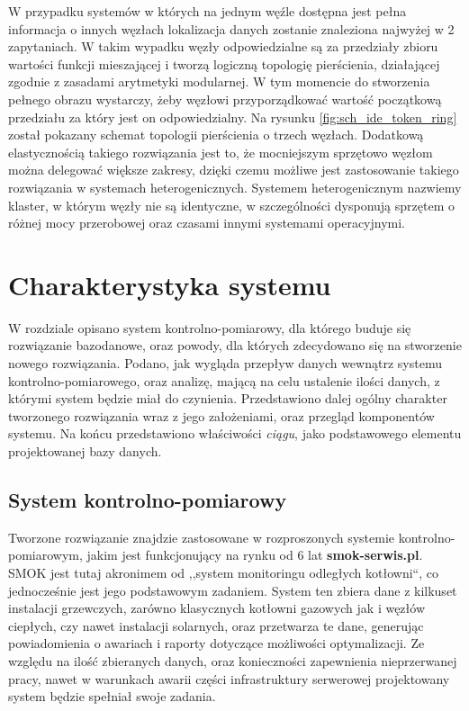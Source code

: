 \documentclass[a4paper,polish,12pt,twoside]{article}
\def \docsection#1{\clearpage\section{#1}}
\begin{document}
W przypadku systemów w których na jednym węźle dostępna jest pełna informacja o innych węzłach lokalizacja danych zostanie znaleziona najwyżej w 2 zapytaniach. W takim wypadku węzły odpowiedzialne są za przedziały zbioru wartości funkcji mieszającej i tworzą logiczną topologię pierścienia, działającej zgodnie z zasadami arytmetyki modularnej. W tym momencie do stworzenia pełnego obrazu wystarczy, żeby węzłowi przyporządkować wartość początkową przedziału za który jest on odpowiedzialny. Na rysunku \ref{fig:sch_ide_token_ring} został pokazany schemat topologii pierścienia o trzech węzłach. Dodatkową elastycznością takiego rozwiązania jest to, że mocniejszym sprzętowo węzłom można delegować większe zakresy, dzięki czemu możliwe jest zastosowanie takiego rozwiązania w systemach heterogenicznych. Systemem heterogenicznym nazwiemy klaster, w którym węzły nie są identyczne, w szczególności dysponują sprzętem o różnej mocy przerobowej oraz czasami innymi systemami operacyjnymi.

	\docsection{Charakterystyka systemu}
W rozdziale opisano system kontrolno-pomiarowy, dla którego buduje się rozwiązanie bazodanowe, oraz powody, dla których zdecydowano się na stworzenie nowego rozwiązania. Podano, jak wygląda przepływ danych wewnątrz systemu kontrolno-pomiarowego, oraz analizę, mającą na celu ustalenie ilości danych, z którymi system będzie miał do czynienia. Przedstawiono dalej ogólny charakter tworzonego rozwiązania wraz z jego założeniami, oraz przegląd komponentów systemu. Na końcu przedstawiono właściwości \textit{ciągu}, jako podstawowego elementu projektowanej bazy danych.

\subsection{System kontrolno-pomiarowy}

Tworzone rozwiązanie znajdzie zastosowane w rozproszonych systemie kontrolno-pomiarowym, jakim jest funkcjonujący na rynku od 6 lat \textbf{smok-serwis.pl}. SMOK\cite{smok} jest tutaj akronimem od ,,system monitoringu odległych kotłowni``, co jednocześnie jest jego podstawowym zadaniem. System ten zbiera dane z kilkuset instalacji grzewczych, zarówno klasycznych kotłowni gazowych jak i węzłów ciepłych, czy nawet instalacji solarnych, oraz przetwarza te dane, generując powiadomienia o awariach i raporty dotyczące możliwości optymalizacji. Ze względu na ilość zbieranych danych, oraz konieczności zapewnienia nieprzerwanej pracy, nawet w warunkach awarii części infrastruktury serwerowej projektowany system będzie spełniał swoje zadania.
\end{document}
